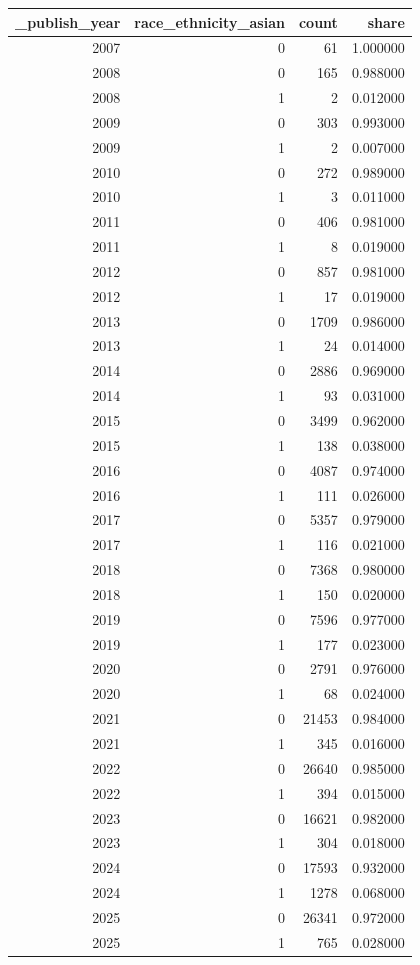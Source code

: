 \begin{tabular}{rrrr}
\toprule
_publish_year & race_ethnicity_asian & count & share \\
\midrule
2007 & 0 & 61 & 1.000000 \\
2008 & 0 & 165 & 0.988000 \\
2008 & 1 & 2 & 0.012000 \\
2009 & 0 & 303 & 0.993000 \\
2009 & 1 & 2 & 0.007000 \\
2010 & 0 & 272 & 0.989000 \\
2010 & 1 & 3 & 0.011000 \\
2011 & 0 & 406 & 0.981000 \\
2011 & 1 & 8 & 0.019000 \\
2012 & 0 & 857 & 0.981000 \\
2012 & 1 & 17 & 0.019000 \\
2013 & 0 & 1709 & 0.986000 \\
2013 & 1 & 24 & 0.014000 \\
2014 & 0 & 2886 & 0.969000 \\
2014 & 1 & 93 & 0.031000 \\
2015 & 0 & 3499 & 0.962000 \\
2015 & 1 & 138 & 0.038000 \\
2016 & 0 & 4087 & 0.974000 \\
2016 & 1 & 111 & 0.026000 \\
2017 & 0 & 5357 & 0.979000 \\
2017 & 1 & 116 & 0.021000 \\
2018 & 0 & 7368 & 0.980000 \\
2018 & 1 & 150 & 0.020000 \\
2019 & 0 & 7596 & 0.977000 \\
2019 & 1 & 177 & 0.023000 \\
2020 & 0 & 2791 & 0.976000 \\
2020 & 1 & 68 & 0.024000 \\
2021 & 0 & 21453 & 0.984000 \\
2021 & 1 & 345 & 0.016000 \\
2022 & 0 & 26640 & 0.985000 \\
2022 & 1 & 394 & 0.015000 \\
2023 & 0 & 16621 & 0.982000 \\
2023 & 1 & 304 & 0.018000 \\
2024 & 0 & 17593 & 0.932000 \\
2024 & 1 & 1278 & 0.068000 \\
2025 & 0 & 26341 & 0.972000 \\
2025 & 1 & 765 & 0.028000 \\
\bottomrule
\end{tabular}
